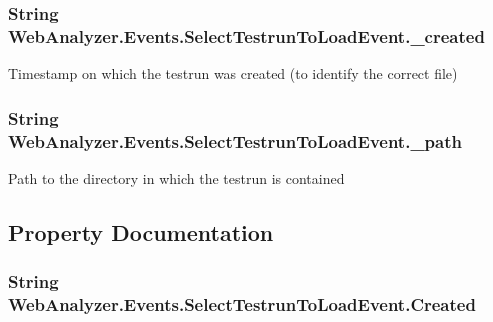 \subsubsection[{\+\_\+created}]{\setlength{\rightskip}{0pt plus 5cm}String Web\+Analyzer.\+Events.\+Select\+Testrun\+To\+Load\+Event.\+\_\+created\hspace{0.3cm}{\ttfamily [private]}}\label{class_web_analyzer_1_1_events_1_1_select_testrun_to_load_event_a583a4f909c17711eea42d817cfebeab7}


Timestamp on which the testrun was created (to identify the correct file) 

\hypertarget{class_web_analyzer_1_1_events_1_1_select_testrun_to_load_event_a27179b9153fc6745c533161d6c1d8e2e}{}
\subsubsection[{\+\_\+path}]{\setlength{\rightskip}{0pt plus 5cm}String Web\+Analyzer.\+Events.\+Select\+Testrun\+To\+Load\+Event.\+\_\+path\hspace{0.3cm}{\ttfamily [private]}}\label{class_web_analyzer_1_1_events_1_1_select_testrun_to_load_event_a27179b9153fc6745c533161d6c1d8e2e}


Path to the directory in which the testrun is contained 



\subsection{Property Documentation}
\hypertarget{class_web_analyzer_1_1_events_1_1_select_testrun_to_load_event_a330e145816f74dc95033cbd983552ca8}{}
\subsubsection[{Created}]{\setlength{\rightskip}{0pt plus 5cm}String Web\+Analyzer.\+Events.\+Select\+Testrun\+To\+Load\+Event.\+Created\hspace{0.3cm}{\ttfamily [get]}}\label{class_web_analyzer_1_1_events_1_1_select_testrun_to_load_event_a330e145816f74dc95033cbd983552ca8}



